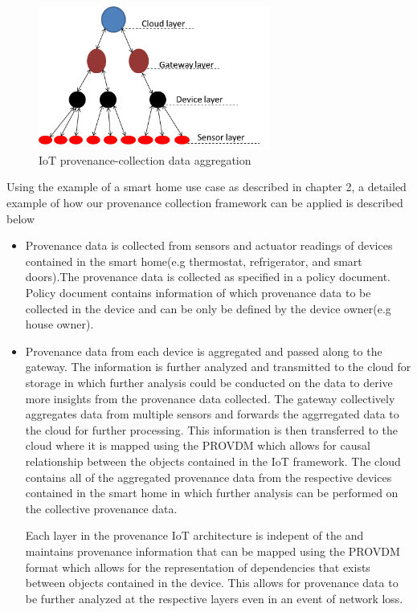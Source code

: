 \begin{figure}[h!]
\begin{center}

\includegraphics[width=3.0in]{iot.PNG}    
\end{center}
\caption{IoT provenance-collection data aggregation}
\label{autom}
\end{figure}


Using the example of a smart home use case as described in chapter 2, a detailed example of how our provenance collection framework can be applied is described below

\begin{itemize}

\item Provenance data is collected from sensors and actuator readings of devices contained in the smart home(e.g thermostat, refrigerator, and smart doors).The provenance data is collected as specified in a policy document. Policy document contains information of which provenance data to be collected in the device and can be only be defined by the device owner(e.g house owner). 

\item Provenance data from each device is aggregated and passed along to the gateway. The information is further analyzed and transmitted to the cloud for storage in which further analysis could be conducted on the data to derive more insights from the provenance data collected. The gateway collectively aggregates data from multiple sensors and forwards the aggrregated data to the cloud for further processing. This information is then transferred to the cloud where it is mapped using the PROV\-DM which allows for causal relationship between the objects contained in the IoT framework. The cloud contains all of the aggregated provenance data from the respective devices contained in the smart home in which further analysis can be performed on the collective provenance data. 


Each layer in the provenance IoT architecture is indepent of the and maintains provenance information that can be mapped using the PROV\-DM format which allows for the representation of dependencies that exists between objects contained in the device.  This allows for provenance data to be further analyzed at the respective layers even in an event of network loss. 



\end{itemize}





